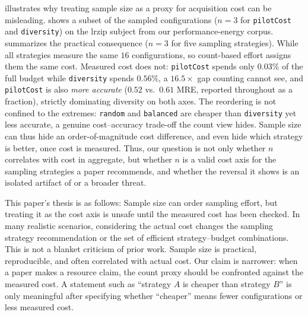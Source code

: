  illustrates why treating sample size as a proxy for acquisition cost can be misleading. 
 shows a subset of the sampled configurations ($n=3$ for \texttt{pilotCost} and \texttt{diversity}) on the lrzip subject from our performance-energy corpus.
 summarizes the practical consequence ($n=3$ for five sampling strategies).
While all strategies measure the same $16$ configurations, so count-based effort assigns them
the same cost. Measured cost does not: \texttt{pilotCost}
spends only $0.03\%$ of the full budget while \texttt{diversity} spends $0.56\%$, a
$16.5\times$ gap counting cannot see, and \texttt{pilotCost} is also \emph{more
accurate} ($0.52$ vs.\ $0.61$ MRE, reported throughout as a fraction), strictly
dominating diversity on both axes. The reordering is not confined to the extremes:
\texttt{random} and \texttt{balanced} are cheaper than \texttt{diversity} yet less
accurate, a genuine cost--accuracy trade-off the count view hides. Sample size can
thus hide an order-of-magnitude cost difference, and even hide which strategy is
better, once cost is measured. Thus, our question is
not only whether $n$ correlates with cost in aggregate, but whether $n$ is a valid
cost axis for the sampling strategies a paper recommends, and whether the reversal
it shows is an isolated artifact of  or a broader threat.

This paper's thesis is as follows: Sample size can order sampling effort, but treating it as the cost axis
is unsafe until the measured cost has been checked. In many
realistic scenarios, considering the actual cost changes the sampling strategy recommendation or the
set of efficient strategy--budget combinations.
This is not a blanket criticism of prior work. Sample size is practical,
reproducible, and often correlated with actual cost. Our claim is narrower:
when a paper makes a resource claim, the count proxy should be confronted against
the measured cost. A statement such as ``strategy $A$ is cheaper
than strategy $B$'' is only meaningful after specifying whether ``cheaper''
means fewer configurations or less measured cost.

